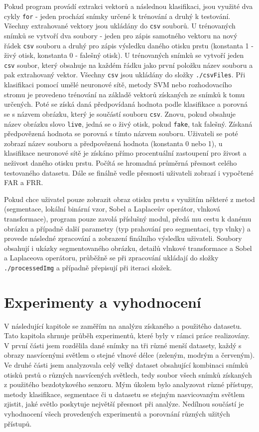 Pokud program provádí extrakci vektorů a následnou klasifikaci, jsou využité dva cykly \verb=for= - jeden prochází snímky určené k trénování a druhý k testování. Všechny extrahované vektory jsou ukládány do \verb=csv= souborů. U trénovaných snímků se vytvoří dva soubory - jeden pro zápis samotného vektoru na nový řádek \verb=csv= souboru a druhý pro zápis výsledku daného otisku prstu (konstanta 1 - živý otisk, konstanta 0 - falešný otisk). U trénovaných snímků se vytvoří jeden \verb=csv= soubor, který obsahuje na každém řádku jako první položku název souboru a pak extrahovaný vektor. Všechny \verb=csv= jsou ukládány do složky \verb=./csvFiles=. Při klasifikaci pomocí umělé neuronové sítě, metody SVM nebo rozhodovacího stromu je provedeno trénování na základě vektorů získaných ze snímků k tomu určených. Poté se získá daná předpovídaná hodnota podle klasifikace a porovná se s názvem obrázku, který je součástí souboru \verb=csv=. Znovu, pokud obsahuje název obrázku slovo \verb=live=, jedná se o živý otisk, pokud \verb=fake=, tak falešný. Získaná předpovězená hodnota se porovná s tímto názvem souboru. Uživateli se poté zobrazí název souboru a předpovězená hodnota (konstanta 0 nebo 1), u klasifikace neuronové sítě je získáno přímo procentuální zastoupení pro živost a neživost daného otisku prstu. Počítá se hromadná průměrná přesnost celého testovaného datasetu. Dále se finálně vedle přesnosti uživateli zobrazí i vypočtené FAR a FRR. 

Pokud chce uživatel pouze zobrazit obraz otisku prstu s využitím některé z metod (segmentace, lokální binární vzor, Sobel a Laplaceův operátor, vlnková transformace), program pouze zavolá příslušný modul, předá mu cestu k danému obrázku a případně další parametry (typ prahování pro segmentaci, typ vlnky) a provede následné zpracování a zobrazení finálního výsledku uživateli. Soubory obsahují i ukázky segmentovaného obrázku, detailů vlnkové transformace a Sobel a Laplaceova operátoru, průběžně se při zpracování ukládají do složky \verb=./processedImg= a případně přepisují při iteraci složek.


\chapter{Experimenty a vyhodnocení}
V následující kapitole se zaměřím na analýzu získaného a použitého datasetu. Tato kapitola shrnuje průběh experimentů, které byly v rámci práce realizovány. V první části jsem rozdělila dané snímky na tři různé menší datasety, každý s obrazy nasvícenými světlem o stejné vlnové délce (zeleným, modrým a červeným). Ve druhé části jsem analyzovala celý velký dataset obsahující kombinaci snímků otisků prstů o různých nasvícených světlech, tedy soubor všech snímků získaných z použitého bezdotykového senzoru. Mým úkolem bylo analyzovat různé přístupy, metody klasifikace, segmentace či u datasetu se stejným nasvicovaným světlem zjistit, jaké světlo poskytuje největší přesnost při analýze. Nedílnou součástí je vyhodnocení všech provedených experimentů a porovnání různých užitých přístupů. 

